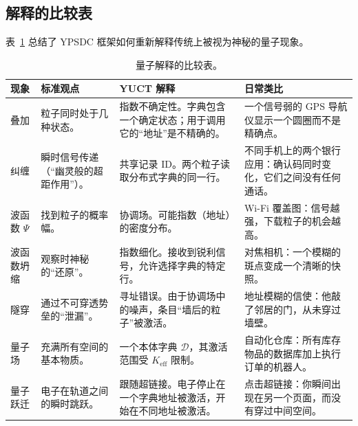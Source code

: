 \documentclass[12pt,a4paper]{article}
\theoremstyle{remark}
\begin{document}
	\medskip
	
	\subsection{解释的比较表}
	
	表~\ref{tab:quantum-interpretations} 总结了 YPSDC 框架如何重新解释传统上被视为神秘的量子现象。
	
	\begin{table}[H]
		\centering
		\caption{量子解释的比较表。}
		\label{tab:quantum-interpretations}
		\small
		\begin{tabularx}{\textwidth}{p{2.8cm} p{3.0cm} p{4.5cm} p{4.5cm}}
			\toprule
			\textbf{现象} & \textbf{标准观点} & \textbf{YUCT 解释} & \textbf{日常类比} \\
			\midrule
			叠加 &
			粒子同时处于几种状态。 &
			指数不确定性。字典包含一个确定状态；用于调用它的“地址”是不精确的。 &
			一个信号弱的 GPS 导航仪显示一个圆圈而不是精确点。 \\
			\addlinespace
			纠缠 &
			瞬时信号传递（“幽灵般的超距作用”）。 &
			共享记录 ID。两个粒子读取分布式字典的同一行。 &
			不同手机上的两个银行应用：确认码同时变化，它们之间没有任何通话。 \\
			\addlinespace
			波函数 \( \Psi \) &
			找到粒子的概率幅。 &
			协调场。可能指数（地址）的密度分布。 &
			Wi-Fi 覆盖图：信号越强，下载粒子的机会越高。 \\
			\addlinespace
			波函数坍缩 &
			观察时神秘的“还原”。 &
			指数细化。接收到锐利信号，允许选择字典的特定行。 &
			对焦相机：一个模糊的斑点变成一个清晰的快照。 \\
			\addlinespace
			隧穿 &
			通过不可穿透势垒的“泄漏”。 &
			寻址错误。由于协调场中的噪声，条目“墙后的粒子”被激活。 &
			地址模糊的信使：他敲了邻居的门，从未穿过墙壁。 \\
			\addlinespace
			量子场 &
			充满所有空间的基本物质。 &
			一个本体字典 \( \mathcal{D} \)，其激活范围受 \( K_{\mathrm{eff}} \) 限制。 &
			自动化仓库：所有库存物品的数据库加上执行订单的机器人。 \\
			\addlinespace
			量子跃迁 &
			电子在轨道之间的瞬时跳跃。 &
			跟随超链接。电子停止在一个字典地址被激活，开始在不同地址被激活。 &
			点击超链接：你瞬间出现在另一个页面，而没有穿过中间空间。 \\
			\bottomrule
		\end{tabularx}
	\end{table}
	
\end{document}
